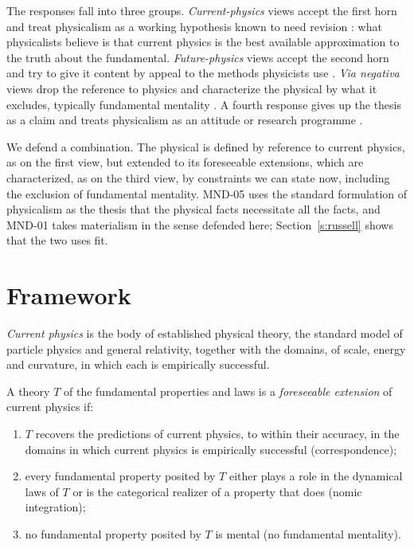 \documentclass{situationist-preprint}
\begin{document}
The responses fall into three groups. \emph{Current-physics} views accept the first horn and treat physicalism as a working hypothesis known to need revision \citep{Melnyk1997}: what physicalists believe is that current physics is the best available approximation to the truth about the fundamental. \emph{Future-physics} views accept the second horn and try to give it content by appeal to the methods physicists use \citep{Dowell2006}. \emph{Via negativa} views drop the reference to physics and characterize the physical by what it excludes, typically fundamental mentality \citep{Montero1999,Wilson2006}. A fourth response gives up the thesis as a claim and treats physicalism as an attitude or research programme \citep{Ney2008}.

We defend a combination. The physical is defined by reference to current physics, as on the first view, but extended to its foreseeable extensions, which are characterized, as on the third view, by constraints we can state now, including the exclusion of fundamental mentality. MND-05 uses the standard formulation of physicalism as the thesis that the physical facts necessitate all the facts, and MND-01 takes materialism in the sense defended here; Section~\ref{s:russell} shows that the two uses fit.

\section{Framework}\label{s:framework}

\begin{definition}\label{d:current}
\emph{Current physics} is the body of established physical theory, the standard model of particle physics and general relativity, together with the domains, of scale, energy and curvature, in which each is empirically successful.
\end{definition}

\begin{definition}\label{d:fore}
A theory $T$ of the fundamental properties and laws is a \emph{foreseeable extension} of current physics if:
\begin{enumerate}[label=(\alph*),nosep]
\item $T$ recovers the predictions of current physics, to within their accuracy, in the domains in which current physics is empirically successful (correspondence);
\item every fundamental property posited by $T$ either plays a role in the dynamical laws of $T$ or is the categorical realizer of a property that does (nomic integration);
\item no fundamental property posited by $T$ is mental (no fundamental mentality).
\end{enumerate}
\end{definition}
\end{document}
